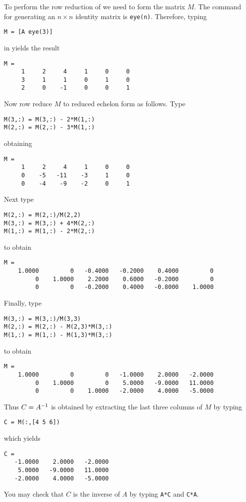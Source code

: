\documentclass{ximera}
\begin{document}
To perform the row reduction of  we need to form the matrix
$M$. The \Matlab command for generating an $n\times n$ identity
matrix is {\tt eye(n)}.  Therefore, typing
\begin{verbatim}
M = [A eye(3)]
\end{verbatim} 
in \Matlab yields the result
\begin{verbatim}
M =
     1     2     4     1     0     0
     3     1     1     0     1     0
     2     0    -1     0     0     1
\end{verbatim}
Now row reduce $M$ to reduced echelon form as follows.  Type
\begin{verbatim}
M(3,:) = M(3,:) - 2*M(1,:)
M(2,:) = M(2,:) - 3*M(1,:)
\end{verbatim}
obtaining
\begin{verbatim}
M =
     1     2     4     1     0     0
     0    -5   -11    -3     1     0
     0    -4    -9    -2     0     1
\end{verbatim}
Next type
\begin{verbatim}
M(2,:) = M(2,:)/M(2,2)
M(3,:) = M(3,:) + 4*M(2,:)
M(1,:) = M(1,:) - 2*M(2,:)
\end{verbatim}
to obtain
{\scriptsize
\begin{verbatim}
M =
    1.0000         0   -0.4000   -0.2000    0.4000         0
         0    1.0000    2.2000    0.6000   -0.2000         0
         0         0   -0.2000    0.4000   -0.8000    1.0000
\end{verbatim}
  \normalsize}
Finally, type
\begin{verbatim}
M(3,:) = M(3,:)/M(3,3)
M(2,:) = M(2,:) - M(2,3)*M(3,:)
M(1,:) = M(1,:) - M(1,3)*M(3,:)
\end{verbatim}
to obtain
{\scriptsize\begin{verbatim}
M =
    1.0000         0         0   -1.0000    2.0000   -2.0000
         0    1.0000         0    5.0000   -9.0000   11.0000
         0         0    1.0000   -2.0000    4.0000   -5.0000
\end{verbatim}
\normalsize}
Thus $C=A^{-1}$ is obtained by extracting the last three columns
of $M$ by typing
\begin{verbatim}
C = M(:,[4 5 6])
\end{verbatim}
which yields
\begin{verbatim}
C =
   -1.0000    2.0000   -2.0000
    5.0000   -9.0000   11.0000
   -2.0000    4.0000   -5.0000
\end{verbatim}
You may check that $C$ is the inverse of $A$ by typing {\tt A*C}
and {\tt C*A}.
\end{document}
